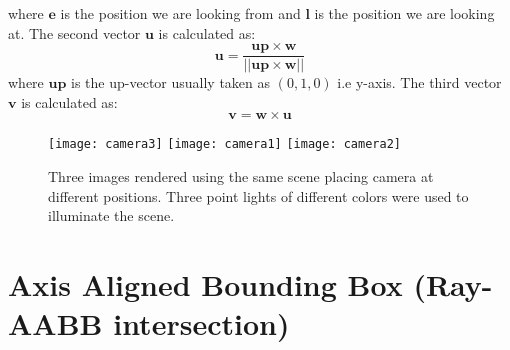 \documentclass[11pt,a4paper]{article}
\begin{document}
	\noindent
	where $\boldsymbol{e}$ is the position we are looking from and $\boldsymbol{l}$ is the position we are looking at. The second vector $\boldsymbol{u}$ is calculated as:
	\begin{equation}
		\boldsymbol{u} = \frac{\boldsymbol{up} \times \boldsymbol{w}}{||\boldsymbol{up} \times \boldsymbol{w}||}
	\end{equation}
	where $\boldsymbol{up}$ is the up-vector usually taken as $(0, 1, 0)$ i.e y-axis. The third vector $\boldsymbol{v}$ is calculated as:
	\begin{equation}
		\boldsymbol{v} = \boldsymbol{w} \times \boldsymbol{u}
	\end{equation}
	\begin{figure}[H]
		\centering
		\captionsetup{justification=centering}
		\texttt{[image: camera3]}\quad
		\texttt{[image: camera1]}\quad
		\texttt{[image: camera2]}\quad
		\caption{Three images rendered using the same scene placing camera at different positions. Three point lights of different colors were used to illuminate the scene.}
	\end{figure}
	
	\section{Axis Aligned Bounding Box (Ray-AABB intersection)}
	
\end{document}
